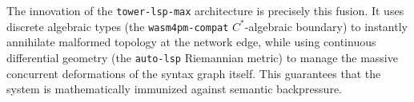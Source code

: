 The innovation of the \texttt{tower-lsp-max} architecture is precisely this fusion. It uses discrete algebraic types (the \texttt{wasm4pm-compat} $C^*$-algebraic boundary) to instantly annihilate malformed topology at the network edge, while using continuous differential geometry (the \texttt{auto-lsp} Riemannian metric) to manage the massive concurrent deformations of the syntax graph itself. This guarantees that the system is mathematically immunized against semantic backpressure.
